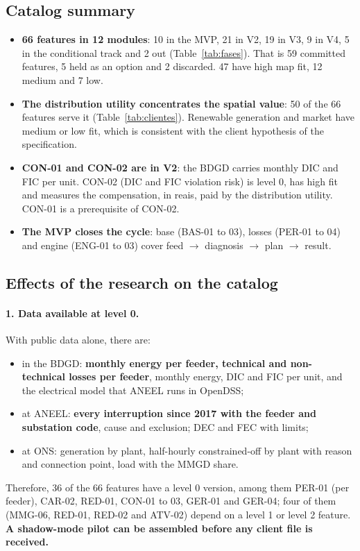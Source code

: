 
\subsection*{Catalog summary}

\begin{itemize}
  \item \textbf{66 features in 12 modules}: 10 in the MVP, 21 in V2, 19 in V3,
    9 in V4, 5 in the conditional track and 2 out (Table~\ref{tab:fases}).
    That is 59 committed features, 5 held as an option and 2 discarded. 47
    have high map fit, 12 medium and 7 low.
  \item \textbf{The distribution utility concentrates the spatial value}: 50
    of the 66 features serve it (Table~\ref{tab:clientes}). Renewable
    generation and market have medium or low fit, which is consistent with
    the client hypothesis of the specification.
  \item \textbf{CON-01 and CON-02 are in V2}: the BDGD carries monthly DIC and
    FIC per unit. CON-02 (DIC and FIC violation risk) is level 0, has high
    fit and measures the compensation, in reais, paid by the distribution
    utility. CON-01 is a prerequisite of CON-02.
  \item \textbf{The MVP closes the cycle}: base (BAS-01 to 03), losses
    (PER-01 to 04) and engine (ENG-01 to 03) cover feed $\rightarrow$
    diagnosis $\rightarrow$ plan $\rightarrow$ result.
\end{itemize}

\subsection*{Effects of the research on the catalog}

\paragraph{1. Data available at level 0.} With public data alone, there are:
\begin{itemize}
  \item in the BDGD: \textbf{monthly energy per feeder, technical and
    non-technical losses per feeder}, monthly energy, DIC and FIC per unit,
    and the electrical model that ANEEL runs in OpenDSS;
  \item at ANEEL: \textbf{every interruption since 2017 with the feeder and
    substation code}, cause and exclusion; DEC and FEC with limits;
  \item at ONS: generation by plant, half-hourly constrained-off by plant
    with reason and connection point, load with the MMGD share.
\end{itemize}
Therefore, 36 of the 66 features have a level 0 version, among them PER-01
(per feeder), CAR-02, RED-01, CON-01 to 03, GER-01 and GER-04; four of them
(MMG-06, RED-01, RED-02 and ATV-02) depend on a level 1 or level 2 feature.
\textbf{A shadow-mode pilot can be assembled before any client file is
received.}

